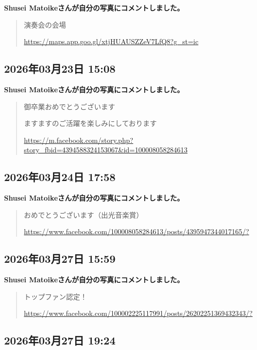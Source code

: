 \textbf{Shusei Matoikeさんが自分の写真にコメントしました。}

\begin{quote}
演奏会の会場

\url{https://maps.app.goo.gl/xtjHUAUSZZeV7LfQ8?g_st=ic}
\end{quote}

\subsection*{2026年03月23日 15:08}

\textbf{Shusei Matoikeさんが自分の写真にコメントしました。}

\begin{quote}
御卒業おめでとうございます

ますますのご活躍を楽しみにしております

\url{https://m.facebook.com/story.php?story_fbid=4394588324153067&id=100008058284613}
\end{quote}

\subsection*{2026年03月24日 17:58}

\textbf{Shusei Matoikeさんが自分の写真にコメントしました。}

\begin{quote}
おめでとうございます（出光音楽賞）

\url{https://www.facebook.com/100008058284613/posts/4395947344017165/?}
\end{quote}

\subsection*{2026年03月27日 15:59}

\textbf{Shusei Matoikeさんが自分の写真にコメントしました。}

\begin{quote}
トップファン認定！

\url{https://www.facebook.com/100002225117991/posts/26202251369432343/?}
\end{quote}

\subsection*{2026年03月27日 19:24}

